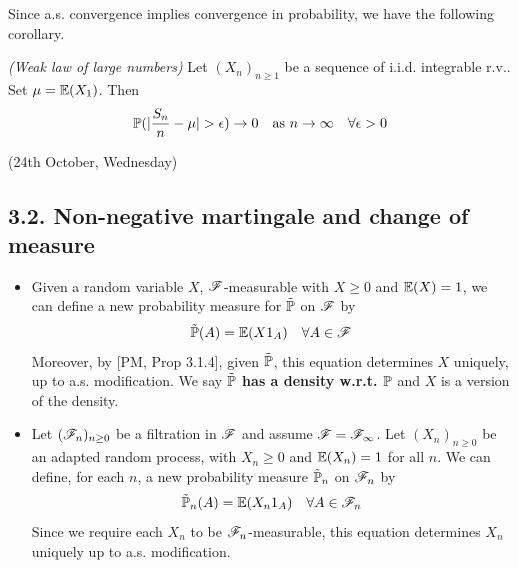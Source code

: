 \documentclass[10pt,a4paper]{report}
\begin{document}
Since a.s. convergence implies convergence in probability, we have the following corollary.
\s

 \emph{(Weak law of large numbers)} Let $(X_n)_{n\geq 1}$ be a sequence of i.i.d. integrable r.v.. Set $\mu =\mathbb{E}(X_1)$. Then 
\begin{align*}
\mathbb{P}(|\frac{S_n}{n} -\mu| > \epsilon) \rightarrow 0 \quad \text{as } n\rightarrow \infty \quad \forall \epsilon >0
\end{align*}
\s

\newday

(24th October, Wednesday)
\s

\subsection*{3.2. Non-negative martingale and change of measure}
\newcommand{\nprob}{\tilde{\prob}}

\begin{itemize}
\item Given a random variable $X$, $\mathscr{F}$-measurable with $X\geq 0$ and $\mathbb{E}(X) =1$, we can define a new probability measure for $\tilde{\mathbb{P}}$ on $\mathscr{F}$ by
\begin{align*}
\tilde{\mathbb{P}}(A) = \mathbb{E}(X1_A) \quad \forall A\in \mathscr{F}
\end{align*}
Moreover, by [PM, Prop 3.1.4], given $\nprob$, this equation determines $X$ uniquely, up to a.s. modification. We say \textbf{$\nprob$ has a density w.r.t. $\mathbb{P}$} and $X$ is a version of the density.
\item Let $(\mathscr{F}_n)_{n\geq 0}$ be a filtration in $\mathscr{F}$ and assume $\mathscr{F} = \mathscr{F}_{\infty}$. Let $(X_n)_{n\geq 0}$ be an adapted random process, with $X_n \geq 0$ and $\mathbb{E}(X_n) =1$ for all $n$. We can define, for each $n$, a new probability measure $\nprob_n$ on $\mathscr{F}_n$ by
\begin{align*}
\nprob_n (A) = \avg(X_n 1_A) \quad \forall A\in \F_n
\end{align*}
Since we require each $X_n$ to be $\mathscr{F}_n$-measurable, this equation determines $X_n$ uniquely up to a.s. modification. 
\end{itemize}
\s
\end{document}

